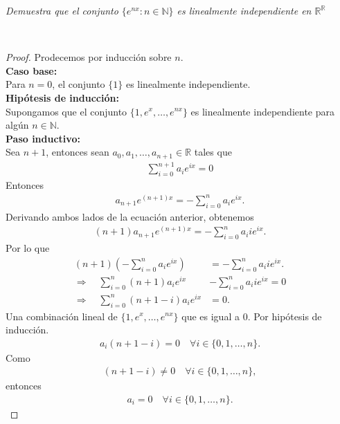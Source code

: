 \documentclass[11pt,letterpaper]{article}
\newcommand{\R}{\mathbb{R}}
\newcommand{\N}{\mathbb{N}}
\begin{document}
\begin{tcolorbox}[
	title = \textcolor{black}{\textcolor{white}{Problema 13}},]
\textit{Demuestra que el conjunto $\{e^{nx}:n\in \N\}$ es linealmente independiente en $\R^\R$
}
\end{tcolorbox}\,\\
\begin{proof}
    Prodecemos por inducción sobre $n$.\\ 
    \textbf{Caso base:}\\ [10pt] Para $n = 0$, el conjunto $\{1\}$ es linealmente independiente.\\ [10pt]
    \textbf{Hipótesis de inducción:}\\ [10pt] Supongamos que el conjunto $\{1, e^x, \dots, e^{nx}\}$ es linealmente independiente para algún $n \in \N$.\\ [10pt]
    \textbf{Paso inductivo:}\\ [10pt] Sea $n + 1$, entonces sean $a_0, a_1, \dots, a_{n+1} \in \R$ tales que
    \begin{align*}
        \sum_{i=0}^{n+1} a_ie^{ix} = 0
    \end{align*}
    Entonces
    \begin{align*}
        a_{n+1} e^{(n+1)x} =-\sum_{i=0}^{n} a_ie^{ix}.
    \end{align*}
    Derivando ambos lados de la ecuación anterior, obtenemos
    \begin{align*}
        (n+1)a_{n+1}e^{(n+1)x}=-\sum_{i=0}^{n} a_i i e^{ix}.
    \end{align*}
    Por lo que
    \begin{align*}
        (n+1)(-\sum_{i=0}^{n} a_ie^{ix})&=-\sum_{i=0}^{n} a_i i e^{ix}.\\
        \Rightarrow \quad \sum_{i=0}^{n} (n+1)a_ie^{ix}&-\sum_{i=0}^{n} a_i i e^{ix}=0\\
        \Rightarrow \quad \sum_{i=0}^{n}(n+1-i)a_ie^{ix}&=0.
    \end{align*}
    Una combinación lineal de $\{1, e^x, \dots, e^{nx}\}$ que es igual a $0$. Por hipótesis de inducción.
    \begin{align*}
        a_i(n+1-i)=0 \quad \forall i \in \{0,1,\dots,n\}.
    \end{align*}
    Como
    \begin{align*}
        (n+1-i)\neq0 \quad \forall i \in \{0,1,\dots,n\},
    \end{align*}
    entonces
    \begin{align*}
        a_i=0 \quad \forall i \in \{0,1,\dots,n\}.

\end{align*}
\end{proof}
\end{document}
